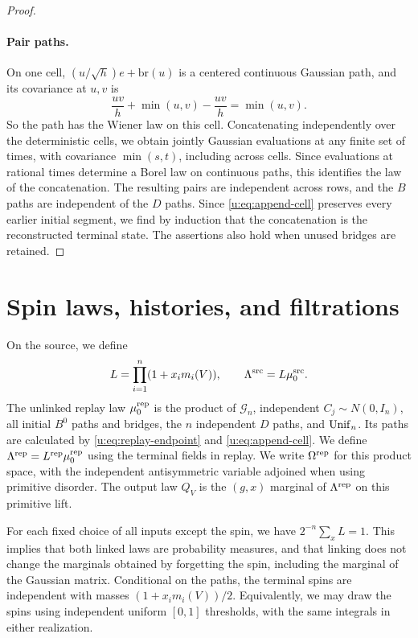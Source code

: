 \begin{proof}
\paragraph{Pair paths.}
On one cell, $(u/\sqrt h)e+\mathrm{br}(u)$ is a centered continuous
Gaussian path, and its covariance at $u,v$ is
\[
 \frac{uv}{h}+\min(u,v)-\frac{uv}{h}=\min(u,v).
\]
So the path has the Wiener law on this cell. Concatenating independently over
the deterministic cells, we obtain jointly Gaussian evaluations at
any finite set of times, with covariance $\min(s,t)$, including across
cells. Since evaluations at rational times determine a Borel law on
continuous paths, this identifies the law of the concatenation. The resulting
pairs are independent across rows, and the $B$ paths are independent
of the $D$ paths. Since \eqref{u:eq:append-cell} preserves every earlier
initial segment, we find by induction that the concatenation is the
reconstructed terminal state. The assertions also hold when unused bridges
are retained.
\end{proof}

\section{Spin laws, histories, and filtrations}\label{u:sec:proposal-laws}

\begin{definition}\label{u:def:laws}
On the source, we define
\begin{equation}\label{u:eq:spin-link}
 L=\prod_{i=1}^n(1+x_i m_i(V)),\qquad
 \Lambda^{\rm src}=L\mu^{\rm src}_0.
\end{equation}
The unlinked replay law $\mu^{\rm rep}_0$ is the product of
$\mathcal G_n$, independent $C_j\sim N(0,I_n)$, all initial $B^0$
paths and bridges, the $n$ independent $D$ paths, and $\operatorname{Unif}_n$.
Its paths are calculated by \eqref{u:eq:replay-endpoint} and
\eqref{u:eq:append-cell}. We define
$\Lambda^{\rm rep}=L^{\rm rep}\mu^{\rm rep}_0$ using the terminal
fields in replay. We write $\Omega^{\rm rep}$ for this product space,
with the independent antisymmetric variable adjoined when using
primitive disorder. The output law $Q_V$ is the $(g,x)$ marginal of
$\Lambda^{\rm rep}$ on this primitive lift.
\end{definition}

For each fixed choice of all inputs except the spin, we have
$2^{-n}\sum_x L=1$. This implies that both linked laws are probability measures,
and that linking does not change the marginals obtained by forgetting the spin,
including the marginal of the Gaussian matrix. Conditional on the paths,
the terminal spins are independent with masses
$(1+x_i m_i(V))/2$. Equivalently, we may draw the spins using independent
uniform $[0,1]$ thresholds, with the same integrals in either
realization.

